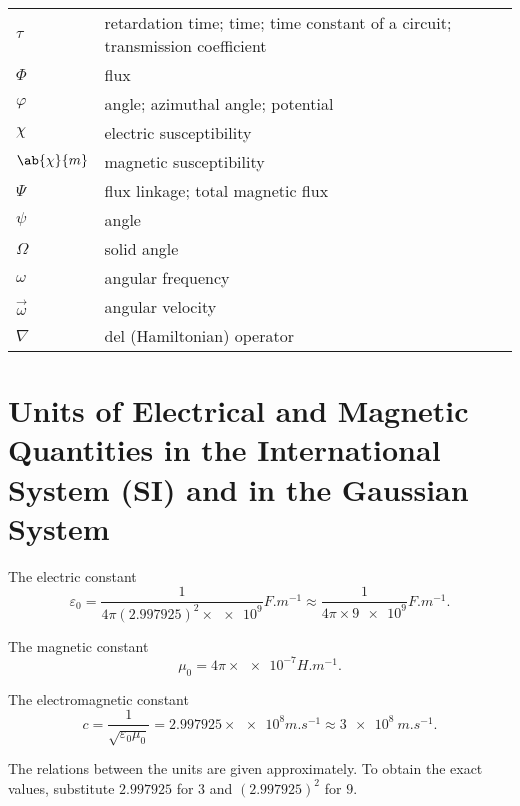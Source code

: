 \begin{table}[h]
\begin{center}
{\begin{tabular}{p{0.5cm} p{11cm}}
				$\tau$ & retardation time; time; time constant of a circuit; transmission coefficient\\
				$\Phi$ & flux\\
				$\varphi$ & angle; azimuthal angle; potential\\
				$\chi$ & electric susceptibility\\
				$\ab{\chi}{m}$ & magnetic susceptibility\\
				$\Psi$ & flux linkage; total magnetic flux\\
				$\psi$ & angle\\
				$\Omega$ & solid angle\\
				$\omega$ & angular frequency\\
				$\vec{\omega}$ & angular velocity\\
				$\nabla$ & del (Hamiltonian) operator\\
			\end{tabular}
	}\end{center}
\end{table}

\clearpage

\section[Units of Electrical and Magnetic Quantities]{Units of Electrical and Magnetic Quantities in the International System (SI)
and in the Gaussian System}\label{sec:A_2}

The electric constant
\begin{equation*}
	\varepsilon_0 = \frac{1}{4\pi (2.997925)^2 \times \num{e9}} \si{F.m^{-1}} \approx \frac{1}{4\pi \times \num{9e9}} \si{F.m^{-1}}.
\end{equation*}

The magnetic constant
\begin{equation*}
	\mu_0 = 4\pi \times \num{e-7} \si{H.m^{-1}}.
\end{equation*}

The electromagnetic constant
\begin{equation*}
	c = \frac{1}{\sqrt{\varepsilon_0\mu_0}} = 2.997925 \times \num{e8} \si{m.s^{-1}} \approx \SI{3e8}{m.s^{-1}}.
\end{equation*}

The relations between the units are given approximately.
To obtain the exact values, substitute $2.997925$ for $3$ and $(2.997925)^2$ for $9$.

